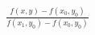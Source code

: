 \documentclass[preview]{standalone}
\begin{document}
\begin{align*}
\frac{f(x, y) - f(x_0, y_0)}{f(x_1, y_0) - f(x_0, y_0)}
\end{align*}
\end{document}
